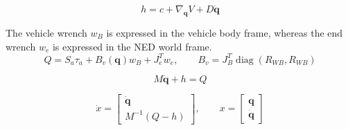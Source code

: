 \documentclass[11pt]{article}
\begin{document}
\begin{equation}
h=c+\nabla_{\boldsymbol q}V+D\dot{\boldsymbol q}
\end{equation}

The vehicle wrench $w_B$ is expressed in the vehicle body frame, whereas the end wrench $w_e$ is expressed in the NED world frame.
\begin{equation}
Q=S_a\tau_a+B_v(\boldsymbol q)w_B+J_e^Tw_e,\qquad B_v=J_B^T\operatorname{diag}(R_{WB},R_{WB})
\end{equation}

\begin{equation}
M\ddot{\boldsymbol q}+h=Q\label{eq:dynamics}
\end{equation}

\begin{equation}
\dot x=\begin{bmatrix}\dot{\boldsymbol q}\\M^{-1}(Q-h)\end{bmatrix},\qquad x=\begin{bmatrix}\boldsymbol q\\\dot{\boldsymbol q}\end{bmatrix}
\end{equation}
\end{document}
